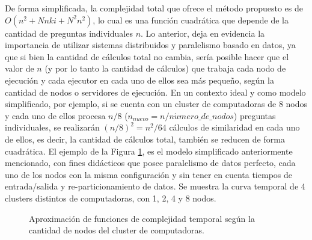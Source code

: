 \bigskip De forma simplificada, la complejidad total que ofrece el método propuesto es de \(O(n^2 + Nnki + N^2n^2)\), lo cual es una función cuadrática que depende de la cantidad de preguntas individuales \(n\). Lo anterior, deja en evidencia la importancia de utilizar sistemas distribuidos y paralelismo basado en datos, ya que si bien la cantidad de cálculos total no cambia, sería posible hacer que el valor de \(n\) (y por lo tanto la cantidad de cálculos) que trabaja cada nodo de ejecución y cada ejecutor en cada uno de ellos sea más pequeño, según la cantidad de nodos o servidores de ejecución. En un contexto ideal y como modelo simplificado, por ejemplo, si se cuenta con un cluster de computadoras de \(8\) nodos y cada uno de ellos procesa \(n/8\) (\(n_{nuevo}=n / n\acute{u}mero\_de\_nodos\)) preguntas individuales, se realizarán \((n/8)^2=n^2/64\) cálculos de similaridad en cada uno de ellos, es decir, la cantidad de cálculos total, también se reducen de forma cuadrática. El ejemplo de la Figura \ref{fig:complejidad_temporal_figura}, es el modelo simplificado anteriormente mencionado, con fines didácticos que posee paralelismo de datos perfecto, cada uno de los nodos con la misma configuración y sin tener en cuenta tiempos de entrada/salida y re-particionamiento de datos. Se muestra la curva temporal de 4 clusters distintos de computadoras, con 1, 2, 4 y 8 nodos.

\begin{figure}[h!]
	\centering
	\caption{Aproximación de funciones de complejidad temporal según la cantidad de nodos del cluster de computadoras.}
	\label{fig:complejidad_temporal_figura}
\end{figure}

